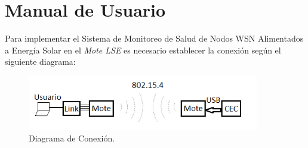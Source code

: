 
\chapter{Manual de Usuario} %

\label{AppendixA} %
Para implementar el Sistema de Monitoreo de Salud de Nodos WSN Alimentados a Energía Solar en el \textit{Mote LSE} es necesario establecer la conexión según el siguiente diagrama:
\vspace{10px}
\begin{figure}[h!]
	\centering
    \includegraphics[width=0.9\textwidth]{./Figures/conex.png}
    	\caption{Diagrama de Conexión.}
	\label{fig:conex}
\end{figure}

